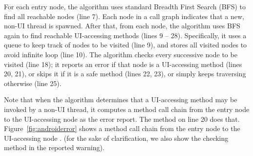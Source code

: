 For each entry node, the algorithm uses standard Breadth First Search (BFS)
to find all reachable  nodes (line 7).
Each  node in a call graph indicates that a new,
non-UI thread is spawned.  After that, from each 
node, the algorithm uses BFS again to find reachable UI-accessing methods (lines 9 -- 28).
Specifically, it uses a queue to keep track of nodes to be visited (line 9),
and stores all visited nodes to avoid infinite loop (line 10).
The algorithm checks every successive node to be visited (line 18);
it reports an error if that node is a UI-accessing method (lines 20, 21), or skips
it if it is a safe method (lines 22, 23), or simply keeps traversing otherwise (line 25).

Note that when the algorithm determines that a UI-accessing method may be invoked
by a non-UI thread, it computes a method call chain from the entry node to
the UI-accessing node as the error report.
The method  on line 20 does that. 
Figure~\ref{fig:androiderror} shows a method call chain from the entry
node  to the UI-accessing node .
(for the sake of clarification, we also show the checking method  in the reported warning).




